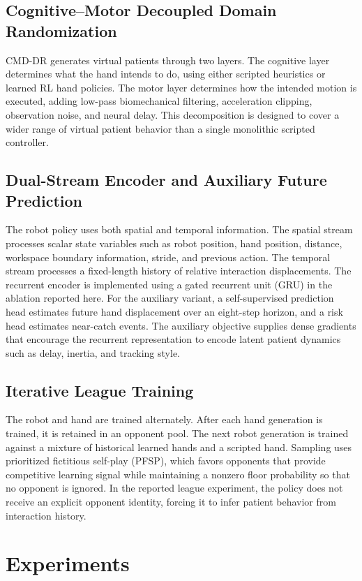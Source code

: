 \documentclass[lettersize,journal]{IEEEtran}
\begin{document}
\subsection{Cognitive--Motor Decoupled Domain Randomization}
CMD-DR generates virtual patients through two layers. The cognitive layer determines what the hand intends to do, using either scripted heuristics or learned RL hand policies. The motor layer determines how the intended motion is executed, adding low-pass biomechanical filtering, acceleration clipping, observation noise, and neural delay. This decomposition is designed to cover a wider range of virtual patient behavior than a single monolithic scripted controller.

\subsection{Dual-Stream Encoder and Auxiliary Future Prediction}
The robot policy uses both spatial and temporal information. The spatial stream processes scalar state variables such as robot position, hand position, distance, workspace boundary information, stride, and previous action. The temporal stream processes a fixed-length history of relative interaction displacements. The recurrent encoder is implemented using a gated recurrent unit (GRU) in the ablation reported here. For the auxiliary variant, a self-supervised prediction head estimates future hand displacement over an eight-step horizon, and a risk head estimates near-catch events. The auxiliary objective supplies dense gradients that encourage the recurrent representation to encode latent patient dynamics such as delay, inertia, and tracking style.

\subsection{Iterative League Training}
The robot and hand are trained alternately. After each hand generation is trained, it is retained in an opponent pool. The next robot generation is trained against a mixture of historical learned hands and a scripted hand. Sampling uses prioritized fictitious self-play (PFSP), which favors opponents that provide competitive learning signal while maintaining a nonzero floor probability so that no opponent is ignored. In the reported league experiment, the policy does not receive an explicit opponent identity, forcing it to infer patient behavior from interaction history.

\section{Experiments}
\end{document}

